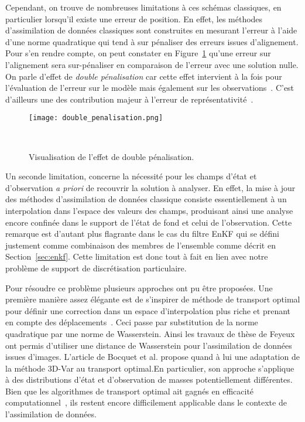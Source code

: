 Cependant, on trouve de nombreuses limitations à ces schémas classiques, en particulier lorsqu'il existe une erreur de position. En effet, les méthodes d'assimilation de données classiques sont construites en mesurant l'erreur à l'aide d'une norme quadratique qui tend à sur pénaliser des erreurs issues d'alignement. Pour s'en rendre compte, on peut constater en Figure~\ref{fig:double_penalization_error} qu'une erreur sur l'alignement sera sur-pénaliser en comparaison de l'erreur avec une solution nulle. On parle d'effet de \textit{double pénalisation} car cette effet intervient à la fois pour l'évaluation de l'erreur sur le modèle mais également sur les observations~\cite{amodei2009}. C'est d’ailleurs une des contribution majeur à l'erreur de représentativité~\cite{janjic2018}.

\begin{figure}[h]
    \centering
    \texttt{[image: double\_penalisation.png]}
    \caption{Visualisation de l'effet de double pénalisation.}~\label{fig:double_penalization_error}
\end{figure}

Un seconde limitation, concerne la nécessité pour les champs d'état et d'observation \textit{a priori} de recouvrir la solution à analyser. En effet, la mise à jour des méthodes d'assimilation de données classique consiste essentiellement à un interpolation dans l'espace des valeurs des champs, produisant ainsi une analyse encore confinée dans le support de l'état de fond et celui de l'observation. Cette remarque est d'autant plus flagrante dans le cas du filtre EnKF qui se défini justement comme combinaison des membres de l'ensemble comme décrit en Section~\ref{sec:enkf}. Cette limitation est donc tout à fait en lien avec notre problème de support de discrétisation particulaire.


Pour résoudre ce problème plusieurs approches ont pu être proposées. Une première manière assez élégante est de s'inspirer de méthode de transport optimal pour définir une correction dans un espace d'interpolation plus riche et prenant en compte des déplacements~\cite{villani2009optimal,benamou_computational_2000}. Ceci passe par substitution de la norme quadratique par une norme de Wasserstein. Ainsi les travaux de thèse de Feyeux~\cite{feyeux_transport_2016} ont permis d'utiliser une distance de Wasserstein pour l'assimilation de données issues d'images. L'article de Bocquet et al. \cite{bocquet_bridging_2023} propose quand à lui une adaptation de la méthode 3D-Var au transport optimal.En particulier, son approche s'applique à des distributions d'état et d'observation de masses potentiellement différentes. Bien que les algorithmes de transport optimal ait gagnés en efficacité computationnel~\cite{cuturi_2014,peyre_cuturi_2019,Simsekli2018SlicedWassersteinFN}, ils restent encore difficilement applicable dans le contexte de l'assimilation de données.

